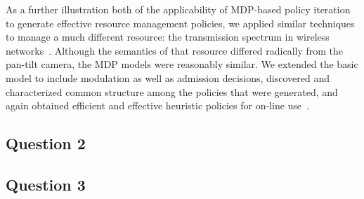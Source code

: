 As a further illustration both of the applicability of MDP-based
policy iteration to generate effective resource management policies,
we applied similar techniques to manage a much different resource:
the transmission spectrum in wireless networks~\cite{mskgct13}.  Although 
the semantics of that resource differed radically from the pan-tilt camera, 
the MDP models were reasonably similar.  We extended the basic model to
include modulation as well as admission decisions, discovered and characterized
common structure among the policies that were generated, and again obtained
efficient and effective heuristic policies for on-line use~\cite{mgc16}.


\subsection{Question 2}


\subsection{Question 3}

